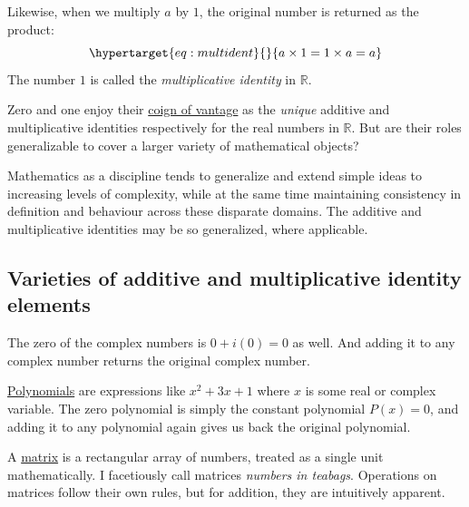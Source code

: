 \documentclass[
  a4paper,
]{article}
\begin{document}
Likewise, when we multiply \(a\) by \(1\), the original number is
returned as the product:
\begin{equation}\protect\hypertarget{eq:multident}{}{
a \times 1 = 1 \times a = a
}\label{eq:multident}\end{equation} The number \(1\) is called the
\emph{multiplicative identity} in \(\mathbb{R}\).

Zero and one enjoy their
\href{https://dictionary.cambridge.org/dictionary/english/coign-of-vantage}{coign
of vantage} as the \emph{unique} additive and multiplicative identities
respectively for the real numbers in \(\mathbb{R}\). But are their roles
generalizable to cover a larger variety of mathematical objects?

Mathematics as a discipline tends to generalize and extend simple ideas
to increasing levels of complexity, while at the same time maintaining
consistency in definition and behaviour across these disparate domains.
The additive and multiplicative identities may be so generalized, where
applicable.

\hypertarget{varieties-of-additive-and-multiplicative-identity-elements}{%
\subsection{Varieties of additive and multiplicative identity
elements}\label{varieties-of-additive-and-multiplicative-identity-elements}}

The zero of the complex numbers is \(0 + i(0) = 0\) as well. And adding
it to any complex number returns the original complex number.

\href{https://mathworld.wolfram.com/Polynomial.html}{Polynomials} are
expressions like \(x^2 + 3x + 1\) where \(x\) is some real or complex
variable. The zero polynomial is simply the constant polynomial
\(P(x) = 0\), and adding it to any polynomial again gives us back the
original polynomial.

A \href{https://mathworld.wolfram.com/Matrix.html}{matrix} is a
rectangular array of numbers, treated as a single unit mathematically. I
facetiously call matrices \emph{numbers in teabags}. Operations on
matrices follow their own rules, but for addition, they are intuitively
apparent.
\end{document}
